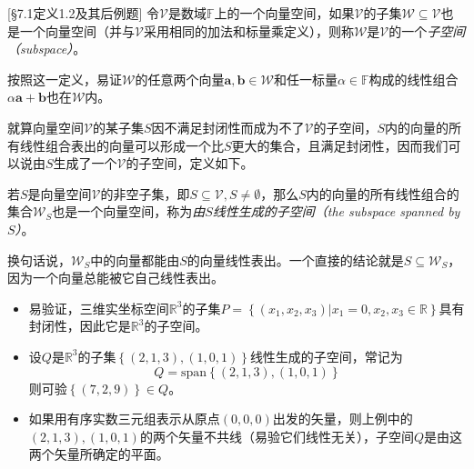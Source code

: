 \documentclass[../main.tex]{subfiles}
\begin{document}
\begin{definition}[子空间]\label{def:II.2.3}\cite{周胜林2012线性代数}[\S 7.1定义1.2及其后例题]
    令$\mathcal{V}$是数域$\mathbb{F}$上的一个向量空间，如果$\mathcal{V}$的子集$\mathcal{W}\subseteq\mathcal{V}$也是一个向量空间（并与$\mathcal{V}$采用相同的加法和标量乘定义），则称$\mathcal{W}$是$\mathcal{V}$的一个\emph{子空间（subspace）}。
\end{definition}

按照这一定义，易证$\mathcal{W}$的任意两个向量$\mathbf{a},\mathbf{b}\in\mathcal{W}$和任一标量$\alpha\in\mathbb{F}$构成的线性组合$\alpha\mathbf{a}+\mathbf{b}$也在$\mathcal{W}$内\cite[\S 7.1定理1.1]{周胜林2012线性代数}。

就算向量空间$\mathcal{V}$的某子集$S$因不满足封闭性而成为不了$\mathcal{V}$的子空间，$S$内的向量的所有线性组合表出的向量可以形成一个比$S$更大的集合，且满足封闭性，因而我们可以说由$S$生成了一个$\mathcal{V}$的子空间，定义如下。

\begin{definition}[线性生成空间]\label{def:II.2.4}
    若$S$是向量空间$\mathcal{V}$的非空子集，即$S\subseteq\mathcal{V},S\neq\emptyset$，那么$S$内的向量的所有线性组合的集合$\mathcal{W}_S$也是一个向量空间，称为\emph{由$S$线性生成的子空间（the subspace spanned by $S$）}。
\end{definition}

换句话说，$\mathcal{W}_S$中的向量都能由$S$的向量线性表出。一个直接的结论就是$S\subseteq\mathcal{W}_S$，因为一个向量总能被它自己线性表出。

\begin{example}\label{exp:II.2.2}
    \quad
    \begin{itemize}
        \item 易验证，三维实坐标空间$\mathbb{R}^3$的子集$P=\left\{\left(x_1,x_2,x_3\right)|x_1=0,x_2,x_3\in\mathbb{R}\right\}$具有封闭性，因此它是$\mathbb{R}^3$的子空间。
        \item 设$Q$是$\mathbb{R}^3$的子集$\left\{\left(2,1,3\right),\left(1,0,1\right)\right\}$线性生成的子空间，常记为\[Q=\mathrm{span}\left\{\left(2,1,3\right),\left(1,0,1\right)\right\}\]则可验$\left\{\left(7,2,9\right)\right\}\in Q$。
        \item 如果用有序实数三元组表示从原点$\left(0,0,0\right)$出发的矢量，则上例中的$\left(2,1,3\right),\left(1,0,1\right)$的两个矢量不共线（易验它们线性无关），子空间$Q$是由这两个矢量所确定的平面。
    \end{itemize}
\end{example}
\end{document}
